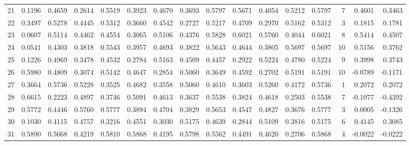 \begin{tabular}{lrrrrrrrrrrrrrrr}
21  &      0.1196 &  0.4659 &  0.2614 &  0.5519 &  0.3923 &  0.4670 &  0.3693 &  0.5797 &  0.5671 &  0.4054 &   0.5212 &     0.5797 &      7 &                    0.4601 &                     0.3463 \\
22  &      0.3497 &  0.5278 &  0.4445 &  0.5312 &  0.3660 &  0.4542 &  0.2727 &  0.5217 &  0.4709 &  0.2970 &   0.5162 &     0.5312 &      3 &                    0.1815 &                     0.1781 \\
23  &      0.0607 &  0.5114 &  0.4462 &  0.4554 &  0.3065 &  0.5106 &  0.4376 &  0.5828 &  0.6021 &  0.5760 &   0.4044 &     0.6021 &      8 &                    0.5414 &                     0.4507 \\
24  &      0.0541 &  0.4303 &  0.3818 &  0.5543 &  0.3957 &  0.4693 &  0.3822 &  0.5643 &  0.4644 &  0.3805 &   0.5697 &     0.5697 &     10 &                    0.5156 &                     0.3762 \\
25  &      0.1226 &  0.4969 &  0.3478 &  0.4532 &  0.2784 &  0.5163 &  0.4509 &  0.4457 &  0.2922 &  0.5224 &   0.4780 &     0.5224 &      9 &                    0.3998 &                     0.3743 \\
26  &      0.5980 &  0.4809 &  0.3074 &  0.5142 &  0.4647 &  0.2854 &  0.5060 &  0.3649 &  0.4592 &  0.2702 &   0.5191 &     0.5191 &     10 &                   -0.0789 &                    -0.1171 \\
27  &      0.3664 &  0.5736 &  0.5228 &  0.3525 &  0.4682 &  0.3558 &  0.5060 &  0.4610 &  0.3603 &  0.5260 &   0.4172 &     0.5736 &      1 &                    0.2072 &                     0.2072 \\
28  &      0.6615 &  0.2223 &  0.4897 &  0.3746 &  0.5091 &  0.4613 &  0.3637 &  0.5538 &  0.3824 &  0.4618 &   0.2503 &     0.5538 &      7 &                   -0.1077 &                    -0.4392 \\
29  &      0.5772 &  0.4446 &  0.5760 &  0.5777 &  0.3894 &  0.4704 &  0.3829 &  0.5653 &  0.4547 &  0.4827 &   0.3676 &     0.5777 &      3 &                    0.0005 &                    -0.1326 \\
30  &      0.1030 &  0.4115 &  0.4757 &  0.3216 &  0.4551 &  0.3030 &  0.5175 &  0.4639 &  0.2844 &  0.5109 &   0.3816 &     0.5175 &      6 &                    0.4145 &                     0.3085 \\
31  &      0.5890 &  0.5668 &  0.4219 &  0.5810 &  0.5868 &  0.4195 &  0.5798 &  0.5562 &  0.4491 &  0.4620 &   0.2706 &     0.5868 &      4 &                   -0.0022 &                    -0.0222 \\

\end{tabular}
